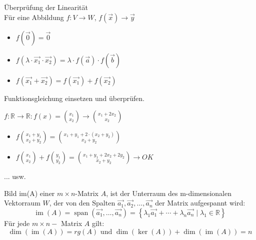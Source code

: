 \begin{KR}{Überprüfung der Linearität}\\
    Für eine Abbildung $f: V \rightarrow W$, $f(\vec{x}) \rightarrow \vec{y}$
    \begin{itemize}
        \item $f(\vec{0}) = \vec{0}$
        \item $f(\lambda \cdot \overrightarrow{x_1} \cdot \vec{x_2}) = \lambda \cdot f(\overrightarrow{a}) \cdot f(\vec{b})$
        \item $f(\vec{x_1} + \vec{x_2}) = f(\vec{x_1}) + f(\vec{x_2})$
    \end{itemize}
    Funktionsgleichung einsetzen und überprüfen.
\end{KR}

\begin{example}
    $f: \mathbb{R} \rightarrow \mathbb{R}: f(x)=\binom{x_{1}}{x_{2}} \rightarrow\binom{x_{1}+2 x_{2}}{x_{2}}$
    \begin{itemize}
    \item $f\binom{x_{1}+y_{1}}{x_{2}+y_{2}}=\binom{x_{1}+y_{1}+2 \cdot\left(x_{2}+y_{2}\right)}{x_{2}+y_{2}}$
    \item $f\binom{x_{1}}{x_{2}}+f\binom{y_{1}}{y_{2}}=\binom{x_{1}+y_{1}+2 x_{2}+2 y_{2}}{x_{2}+y_{2}} \rightarrow O K$
    \end{itemize}
    ... usw.
\end{example}

\begin{definition}{Bild im(A)}
    einer $m \times n$-Matrix $A$, ist der Unterraum des m-dimensionalen Vektorraum $W$, der von den Spalten $\overrightarrow{a_{1}}, \overrightarrow{a_{2}}, \ldots, \overrightarrow{a_{n}}$ der Matrix aufgespannt wird:
    $$
    \operatorname{im}(A)=\operatorname{span}\left(\overrightarrow{a_{1}}, \ldots, \overrightarrow{a_{n}}\right)=\left\{\lambda_{1} \overrightarrow{a_{1}}+\cdots+\lambda_{n} \overrightarrow{a_{n}} \mid \lambda_{1} \in \mathbb{R}\right\}
    $$
    Für jede $m \times n-$ Matrix $A$ gilt:
    $$
    \operatorname{dim}(\operatorname{im}(A))=r g(A) \text { und } \operatorname{dim}(\operatorname{ker}(A))+\operatorname{dim}(\operatorname{im}(A))=n
    $$  
\end{definition}

